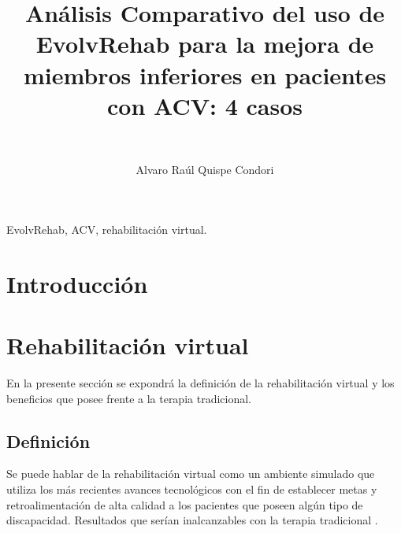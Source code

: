 \documentclass[journal]{IEEEtran}
\begin{document}
\title{Análisis Comparativo del uso de EvolvRehab para la mejora de miembros inferiores en pacientes con ACV: 4 casos}

\author{%
\\
}
\author{Alvaro Raúl Quispe Condori\\
}


\maketitle

\begin{abstract}

\end{abstract}

\begin{IEEEkeywords}
    EvolvRehab, ACV, rehabilitación virtual.
\end{IEEEkeywords}


\section{Introducción}
\section{Rehabilitación virtual}
En la presente sección se expondrá la definición de la rehabilitación virtual y los beneficios que posee frente a la terapia tradicional.
\subsection{Definición}
Se puede hablar de la rehabilitación virtual como un ambiente simulado \cite{sutherland1965ultimate} que utiliza los más recientes avances tecnológicos con el fin de establecer metas y retroalimentación de alta calidad a los pacientes que poseen algún tipo de discapacidad. Resultados que serían inalcanzables con la terapia tradicional \cite{weiss2009moving}.
\end{document}
